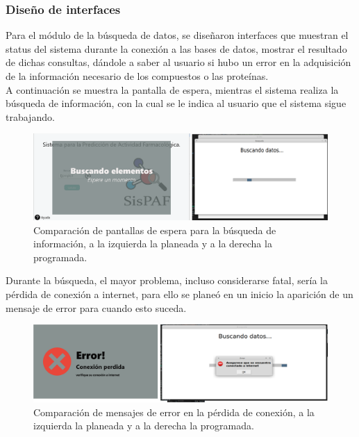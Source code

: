 \subsubsection{Diseño de interfaces}{
\noindent Para el módulo de la búsqueda de datos, se diseñaron interfaces que muestran el status del sistema durante la conexión a las bases de datos, mostrar el resultado de dichas consultas, dándole a saber al usuario si hubo un error en la adquisición de la información necesario de los compuestos o las proteínas.\\

\noindent A continuación se muestra la pantalla de espera, mientras el sistema realiza la búsqueda de información, con la cual se le indica al usuario que el sistema sigue trabajando.
}

\begin{figure}[H]
    \centering
    \includegraphics[scale=0.235]{Capitulo4/Documentos/imagenes_generacion/Esperabusqueda.png}
    \caption{Comparación de pantallas de espera para la búsqueda de información, a la izquierda la planeada y a la derecha la programada.}
    \label{comparacion_3}
\end{figure}

\noindent Durante la búsqueda, el mayor problema, incluso considerarse fatal, sería la pérdida de conexión a internet, para ello se planeó en un inicio la aparición de un mensaje de error para cuando esto suceda.

\begin{figure}[H]
    \centering
    \includegraphics[scale=0.375]{Capitulo4/Documentos/imagenes_generacion/errorNet.png}
    \caption{Comparación de mensajes de error en la pérdida de conexión, a la izquierda la planeada y a la derecha la programada.}
    \label{comparacion_4}
\end{figure}

